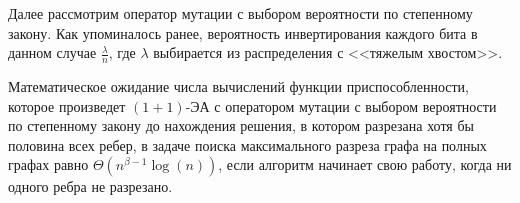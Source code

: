 \documentclass[times]{itmo-student-thesis}
\newcommand{\oea}{\mbox{$(1 + 1)$-ЭА}\xspace}
\begin{document}

Далее рассмотрим оператор мутации с выбором вероятности по степенному закону. Как упоминалось ранее, вероятность инвертирования каждого бита в данном случае $\frac{\lambda}{n}$, где $\lambda$ выбирается из распределения с <<тяжелым хвостом>>.

\begin{theorem} \label{thm:power}
  Математическое ожидание числа вычислений функции приспособленности, которое произведет \oea с оператором мутации с выбором вероятности по степенному закону до нахождения решения, в котором разрезана хотя бы половина всех ребер, в задаче поиска максимального разреза графа на полных графах равно $\Theta(n^{\beta - 1}\log(n))$, если алгоритм начинает свою работу, когда ни одного ребра не разрезано.
\end{theorem}
\end{document}
